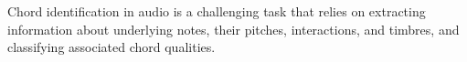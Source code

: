 Chord identification in audio is a challenging task that relies on extracting information about underlying notes, their pitches, interactions, and timbres, and classifying associated chord qualities.



